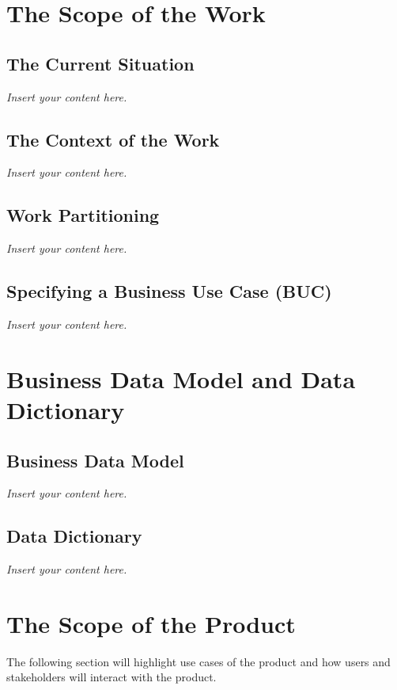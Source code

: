 \documentclass[12pt]{article}
\newcommand{\lips}{\textit{Insert your content here.}}
\begin{document}
\section{The Scope of the Work}
\subsection{The Current Situation}
\lips
\subsection{The Context of the Work}
\lips
\subsection{Work Partitioning}
\lips
\subsection{Specifying a Business Use Case (BUC)}
\lips

\section{Business Data Model and Data Dictionary}
\subsection{Business Data Model}
\lips
\subsection{Data Dictionary}
\lips

\section{The Scope of the Product}
The following section will highlight use cases of the product and how users and
stakeholders will interact with the product.  
\end{document}
